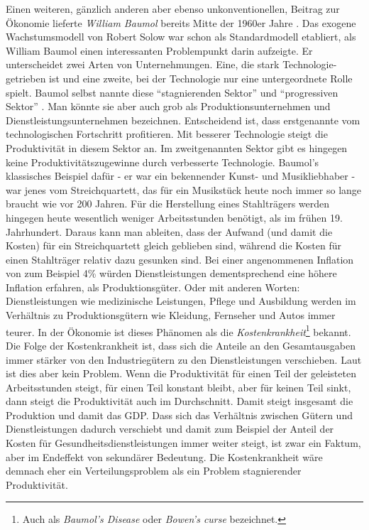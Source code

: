 Einen weiteren, gänzlich anderen aber ebenso unkonventionellen, Beitrag zur Ökonomie lieferte \textit{William Baumol} bereits Mitte der 1960er Jahre \parencite{Baumol1965, Baumol1967}. Das exogene Wachstumsmodell von Robert Solow war schon als Standardmodell etabliert, als William Baumol einen interessanten Problempunkt darin aufzeigte. Er unterscheidet zwei Arten von Unternehmungen. Eine, die stark Technologie-getrieben ist und eine zweite, bei der Technologie nur eine untergeordnete Rolle spielt. Baumol selbst nannte diese "`stagnierenden Sektor"' und "`progressiven Sektor"' \parencite[S. XX]{Baumol2012}. Man könnte sie aber auch grob als Produktionsunternehmen und Dienstleistungsunternehmen bezeichnen. Entscheidend ist, dass erstgenannte vom technologischen Fortschritt profitieren. Mit besserer Technologie steigt die Produktivität in diesem Sektor an. Im zweitgenannten Sektor gibt es hingegen keine Produktivitätszugewinne durch verbesserte Technologie. Baumol's klassisches Beispiel dafür - er war ein bekennender Kunst- und Musikliebhaber \parencite[S. 228]{Krueger2001Interview} - war jenes vom Streichquartett, das für ein Musikstück heute noch immer so lange braucht wie vor 200 Jahren. Für die Herstellung eines Stahlträgers werden hingegen heute wesentlich weniger Arbeitsstunden benötigt, als im frühen 19. Jahrhundert. Daraus kann man ableiten, dass der Aufwand (und damit die Kosten) für ein Streichquartett gleich geblieben sind, während die Kosten für einen Stahlträger relativ dazu gesunken sind. Bei einer angenommenen Inflation von zum Beispiel 4\% würden Dienstleistungen dementsprechend eine höhere Inflation erfahren, als Produktionsgüter. Oder mit anderen Worten: Dienstleistungen wie medizinische Leistungen, Pflege und Ausbildung werden im Verhältnis zu Produktionsgütern wie Kleidung, Fernseher und Autos immer teurer. In der Ökonomie ist dieses Phänomen als die \textit{Kostenkrankheit}\footnote{Auch als \textit{Baumol's Disease} oder \textit{Bowen's curse} bezeichnet\parencite[S. 3]{Baumol2012}.} bekannt.
Die Folge der Kostenkrankheit ist, dass sich die Anteile an den Gesamtausgaben immer stärker von den Industriegütern zu den Dienstleistungen verschieben. Laut \textcite[S. 43]{Baumol2012} ist dies aber kein Problem. Wenn die Produktivität für einen Teil der geleisteten Arbeitsstunden steigt, für einen Teil konstant bleibt, aber für keinen Teil sinkt, dann steigt die Produktivität auch im Durchschnitt. Damit steigt insgesamt die Produktion und damit das GDP. Dass sich das Verhältnis zwischen Gütern und Dienstleistungen dadurch verschiebt und damit zum Beispiel der Anteil der Kosten für Gesundheitsdienstleistungen immer weiter steigt, ist zwar ein Faktum, aber im Endeffekt von sekundärer Bedeutung. Die Kostenkrankheit wäre demnach eher ein Verteilungsproblem als ein Problem stagnierender Produktivität. 

